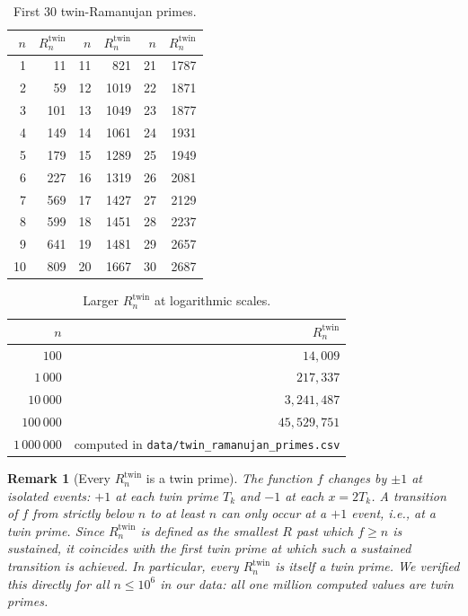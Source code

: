 \documentclass[11pt]{article}
\newtheorem{remark}[theorem]{Remark}
\begin{document}
\begin{table}[h]
\centering
\caption{First 30 twin-Ramanujan primes.}\label{tab:R-first}
\begin{tabular}{rr|rr|rr}
\toprule
$n$ & $R^{\mathrm{twin}}_n$ & $n$ & $R^{\mathrm{twin}}_n$ & $n$ & $R^{\mathrm{twin}}_n$ \\
\midrule
1 & 11 & 11 & 821 & 21 & 1787 \\
2 & 59 & 12 & 1019 & 22 & 1871 \\
3 & 101 & 13 & 1049 & 23 & 1877 \\
4 & 149 & 14 & 1061 & 24 & 1931 \\
5 & 179 & 15 & 1289 & 25 & 1949 \\
6 & 227 & 16 & 1319 & 26 & 2081 \\
7 & 569 & 17 & 1427 & 27 & 2129 \\
8 & 599 & 18 & 1451 & 28 & 2237 \\
9 & 641 & 19 & 1481 & 29 & 2657 \\
10 & 809 & 20 & 1667 & 30 & 2687 \\
\bottomrule
\end{tabular}
\end{table}

\begin{table}[h]
\centering
\caption{Larger $R^{\mathrm{twin}}_n$ at logarithmic scales.}\label{tab:R-log}
\begin{tabular}{rr}
\toprule
$n$ & $R^{\mathrm{twin}}_n$ \\
\midrule
$100$           & $14{,}009$ \\
$1\,000$        & $217{,}337$ \\
$10\,000$       & $3{,}241{,}487$ \\
$100\,000$      & $45{,}529{,}751$ \\
$1\,000\,000$   & computed in \texttt{data/twin\_ramanujan\_primes.csv} \\
\bottomrule
\end{tabular}
\end{table}

\begin{remark}[Every $R^{\mathrm{twin}}_n$ is a twin prime]
\label{rem:R-is-twin}
The function $f$ changes by $\pm 1$ at isolated events: $+1$ at each
twin prime $T_k$ and $-1$ at each $x = 2T_k$. A transition of $f$
from strictly below $n$ to at least $n$ can only occur at a $+1$
event, i.e., at a twin prime. Since $R^{\mathrm{twin}}_n$ is defined
as the smallest $R$ past which $f\ge n$ is sustained, it coincides
with the first twin prime at which such a sustained transition is
achieved. In particular, every $R^{\mathrm{twin}}_n$ is itself a twin
prime. We verified this directly for all $n\le 10^6$ in our data: all
one million computed values are twin primes.
\end{remark}
\end{document}
